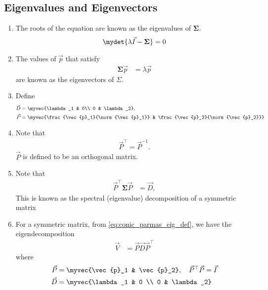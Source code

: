 \documentclass{article}
\numberwithin{equation}{section}
\numberwithin{figure}{section}
\begin{document}
\subsection{Eigenvalues and Eigenvectors}
\begin{enumerate}[label=\thesubsection.\arabic*.,ref=\thesubsection.\theenumi]
	\item The roots of the equation are known as the eigenvalues of $\bm{\Sigma}$.
\begin{align}
	\mydet{\lambda \vec{I}-\bm{\Sigma}} = 0
\end{align}
	\item The values of $\vec{p}$ that satisfy
\begin{align}
	\bm{\Sigma}\vec{p}
	&=\lambda\vec{p}
\end{align}
are known as the eigenvectors of $\Sigma$.
	\item Define
    \begin{align}
      \label{eq:conic_parmas_eig_def-D}
      \vec{D} &= \myvec{\lambda_1 & 0\\ 0 & \lambda_2}, 
      \\
	    \vec{P} &= \myvec{\frac{\vec{p}_1}{\norm{\vec{p}_1}} & \frac{\vec{p}_2}{\norm{\vec{p}_2}}}
      \label{eq:eigevecP}
    \end{align}
    \item Note that
  \begin{align}
\vec{P}^{\top}=\vec{P}^{-1}.
  \label{eq:orth-mat}
  \end{align}
  $\vec{P}$ is defined to be an orthogonal matrix.
	\item Note that
    \begin{align}
      \label{eq:conic_parmas_eig_def}
      \vec{P}^{\top}\bm{\Sigma}\vec{P} &= \vec{D},
    \end{align} 
		This is known as the spectral (eigenvalue) decomposition of a symmetric matrix 
	\item For a symmetric matrix, from \eqref{eq:conic_parmas_eig_def}, we have the eigendecomposition
\begin{align}
	\vec{V}&=\vec{P}\vec{D}
      \label{eq:conic_eig_def}
\vec{P}^{\top}
\end{align}
where 
%
\begin{align}
	\vec{P} &= \myvec{\vec{p}_1 & \vec{p}_2}, \quad 
\vec{P}^{\top}\vec{P} = 
	\vec{I}
\label{eq:eig_matrix}
\\
      \label{eq:D}
	  \vec{D} &= \myvec{\lambda_1 & 0 \\ 0 & \lambda_2}
\end{align}
\end{enumerate}
\end{document}
